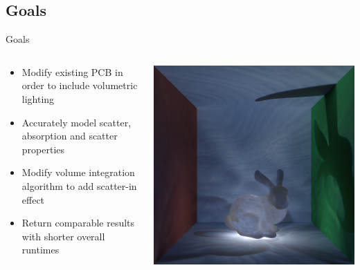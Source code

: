 \documentclass[10pt,compress,professionalfont]{beamer}
\begin{document}
\subsection{Goals}
\begin{frame}{Goals}

    \begin{columns}
        \begin{column}{0.5\textwidth}

            \vspace{-4mm}
            \begin{itemize}
                \item Modify existing PCB in order to include volumetric lighting\\ \vspace{2mm}
                \item Accurately model scatter, absorption and scatter properties\\ \vspace{2mm}
                \item Modify volume integration algorithm to add scatter-in effect\\ \vspace{2mm}
                \item Return comparable results with shorter overall runtimes
            \end{itemize}
        \end{column}
        \begin{column}{0.5\textwidth}
            \includegraphics[width=\textwidth]{../img/bunny_glow}
        \end{column}
    \end{columns}

\end{frame}
\end{document}
